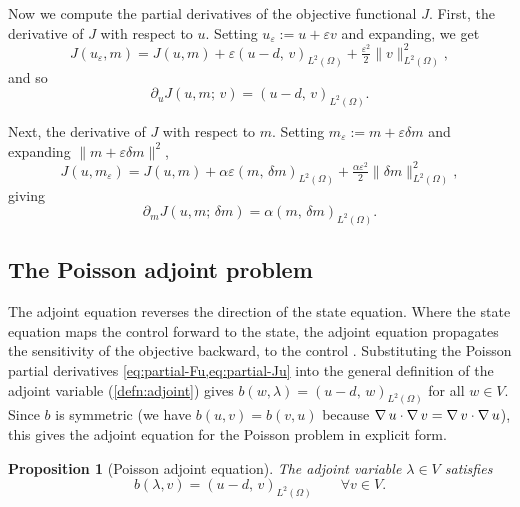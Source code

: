 \documentclass[a4paper,11pt]{article}
\newcommand{\Om}{\Omega}
\newcommand{\Lp}[1]{L^{2}(#1)}              %
\newcommand{\inner}[3]{(#1,\,#2)_{#3}}        %
\theoremstyle{spacedplain} \newtheorem{theorem}[counter]{Theorem} \newtheorem{lemma}[counter]{Lemma} \newtheorem{prop}[counter]{Proposition} \newtheorem{cor}[counter]{Corollary}
\theoremstyle{spaceddefinition} \newtheorem{defn}[counter]{Definition} \newtheorem{example}[counter]{Example} \newtheorem{remark}[counter]{Remark}
\begin{document}
Now we compute the partial derivatives of the objective functional $J$. First, the derivative of $J$ with respect to $u$. Setting $u_\varepsilon := u + \varepsilon v$ and expanding, we get
\begin{equation}
  J(u_\varepsilon, m)
  = J(u, m)
  + \varepsilon \inner{u - d}{v}{\Lp{\Om}}
  + \tfrac{\varepsilon^2}{2} \|v\|_{\Lp{\Om}}^2,
\end{equation}
and so
\begin{equation}
  \label{eq:partial-Ju}
  \partial_u J(u, m;\, v) = \inner{u - d}{v}{\Lp{\Om}}.
\end{equation}

Next, the derivative of $J$ with respect to $m$. Setting $m_\varepsilon := m + \varepsilon \delta m$ and expanding $\|m + \varepsilon \delta m\|^2$,
\begin{equation}
  J(u, m_\varepsilon)
  = J(u, m)
  + \alpha \varepsilon \inner{m}{\delta m}{\Lp{\Om}}
  + \tfrac{\alpha \varepsilon^2}{2} \|\delta m\|_{\Lp{\Om}}^2,
\end{equation}
giving
\begin{equation}
  \label{eq:partial-Jm}
  \partial_m J(u, m;\, \delta m) = \alpha \inner{m}{\delta m}{\Lp{\Om}}.
\end{equation}

\subsection{The Poisson adjoint problem}
\label{sec:deriv:adjoint}

The adjoint equation reverses the direction of the state equation. Where the state equation maps the control forward to the state, the adjoint equation propagates the sensitivity of the objective backward, to the control \citep[p.~33]{shfp2017}. Substituting the Poisson partial derivatives \cref{eq:partial-Fu,eq:partial-Ju} into the general definition of the adjoint variable (\cref{defn:adjoint}) gives $b(w, \lambda) = \inner{u - d}{w}{\Lp{\Om}}$ for all $w \in V$. Since $b$ is symmetric (we have $b(u, v) = b(v, u)$ because $\operatorname{\nabla} u \cdot \operatorname{\nabla} v = \operatorname{\nabla} v \cdot \operatorname{\nabla} u$), this gives the adjoint equation for the Poisson problem in explicit form.

\begin{prop}[Poisson adjoint equation]
\label{prop:adjoint} The adjoint variable $\lambda \in V$ satisfies
\begin{equation}
  \label{eq:adjoint-implicit}
  b(\lambda, v) = \inner{u - d}{v}{\Lp{\Om}}
  \qquad \forall v \in V.
\end{equation}
\end{prop}
\end{document}
